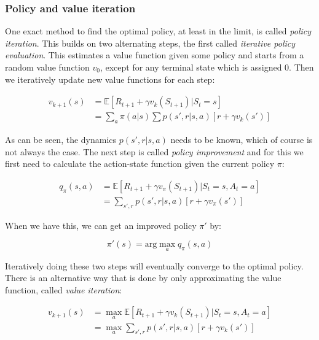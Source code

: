 \subsubsection{Policy and value iteration}

One exact method to find the optimal policy, at least in the limit, is called
\textit{policy iteration}. This builds on two alternating steps, the first
called \textit{iterative policy evaluation}. This estimates a value function
given some policy and starts from a random value function $v_0$, except for any
terminal state which is assigned $0$. Then we iteratively update new value
functions for each step:

\begin{align*}
    v_{k+1}(s) &= \mathbb{E}\left[R_{t+1} + \gamma v_{k}(S_{t+1}) | S_t=s \right] \\
               &= \sum_a \pi (a|s) \sum p(s', r|s, a) \left[r + \gamma v_k(s')\right]
\end{align*}

As can be seen, the dynamics $p(s', r|s, a)$ needs to be known, which of course
is not always the case. The next step is called \textit{policy improvement} and for this
we first need to calculate the action-state function given the current policy
$\pi$:

\begin{align*}
    q_\pi(s, a) &= \mathbb{E}\left[R_{t+1} + \gamma v_\pi(S_{t+1}) | S_t=s, A_t = a \right] \\
                &= \sum_{s', r} p(s', r|s, a) \left[r + \gamma v_\pi(s')\right]
\end{align*}

When we have this, we can get an improved policy $\pi'$ by:

\begin{equation}
    \pi'(s) = \text{arg}\max_a q_\pi(s, a)
\end{equation}

Iteratively doing these two steps will eventually converge to the optimal
policy. There is an alternative way that is done by only approximating the
value function, called \textit{value iteration}:

\begin{align*}
    v_{k+1}(s) &= \max_a \mathbb{E}\left[R_{t+1} + \gamma v_k(S_{t+1}) | S_t=s, A_t = a \right] \\
             &= \max_a \sum_{s', r} p(s', r|s, a) \left[r + \gamma v_k(s')\right]
\end{align*}

